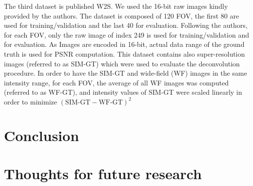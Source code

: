 \documentclass[review]{cvpr}
\begin{document}
The third dataset is published W2S. We used the 16-bit raw images kindly provided by the authors. The dataset is composed of 120 FOV, the first 80 are used for training/validation and the last 40 for evaluation. Following the authors, for each FOV, only the raw image of index 249 is used for training/validation and for evaluation. As Images are encoded in 16-bit, actual data range of the ground truth is used for PSNR computation.
This dataset contains also super-resolution images (referred to as SIM-GT) which were used to evaluate the deconvolution procedure. In order to have the SIM-GT and wide-field (WF) images in the same intensity range, for each FOV, the average of all WF images was computed (referred to as WF-GT), and intensity values of SIM-GT were scaled linearly in order to minimize
$( \textrm{SIM-GT} - \textrm{WF-GT})^2$

\section{Conclusion}



{\small


}

\clearpage
\newpage

\section{Thoughts for future research}
\end{document}
